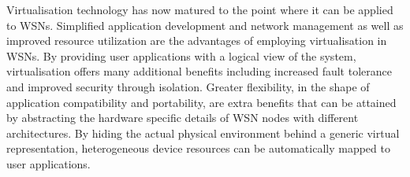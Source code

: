 \bigskip
Virtualisation technology has now matured to the point where it can be applied to WSNs. Simplified application development and network management as well as improved resource utilization are the advantages of employing virtualisation in WSNs. By providing user applications with a logical view of the system, virtualisation  offers many additional benefits including increased fault tolerance and improved security through isolation. Greater flexibility, in the shape of application compatibility and portability, are extra benefits that can be attained by abstracting the hardware specific details of WSN nodes with different architectures. By hiding the actual physical environment behind a generic virtual representation, heterogeneous device resources can be automatically mapped to user applications.

